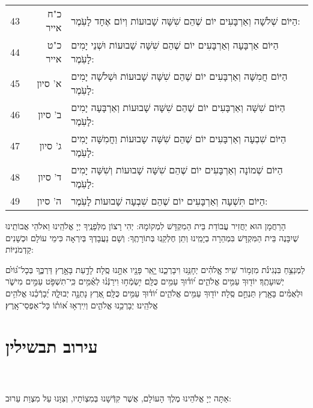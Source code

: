 \documentclass[twoside, openany, parskip=half, 11pt]{book}
\begin{document}
\begin{scriptsize}
\begin{longtable}{ l | r | p{} }
 43 &  כ"ח אייר & הַיּוֹם שְׁלֹשָׁה וְאַרְבָּעִים יוֹם שֶׁהֵם שִׁשָּׁה שָׁבוּעוֹת וְיוֹם אֶחָד לָעֹֽמֶר: \\
 44 &  כ"ט אייר & הַיּוֹם אַרְבָּעָה וְאַרְבָּעִים יוֹם שֶׁהֵם שִׁשָּׁה שָׁבוּעוֹת וּשְׁנֵי יָמִים לָעֹֽמֶר: \\
 45 &  א' סיון & הַיּוֹם חֲמִשָּׁה וְאַרְבָּעִים יוֹם שֶׁהֵם שִׁשָּׁה שָׁבוּעוֹת וּשְׁלֹשָׁה יָמִים לָעֹֽמֶר: \\
 46 &  ב' סיון &  הַיּוֹם שִׁשָּׁה וְאַרְבָּעִים יוֹם שֶׁהֵם שִׁשָּׁה שָׁבוּעוֹת וְאַרְבָּעָה יָמִים לָעֹֽמֶר: \\
  47 &  ג' סיון &  הַיּוֹם שִׁבְעָה וְאַרְבָּעִים יוֹם שֶׁהֵם שִׁשָּׁה שָבוּעוֹת וַחֲמִשָּׁה יָמִים לָעֹֽמֶר: \\
 48 &  ד' סיון &  הַיּוֹם שְׁמוֹנָה וְאַרְבָּעִים יוֹם שֶׁהֵם שִׁשָּׁה שָׁבוּעוֹת וְשִׁשָּׁה יָמִים לָעֹֽמֶר: \\
49 &  ה' סיון & הַיּוֹם תִּשְׁעָה וְאַרְבָּעִים יוֹם שֶׁהֵם שִׁבְעָה שָׁבוּעוֹת לָעֹֽמֶר:
\end{longtable}
\end{scriptsize}



הָרַחֲמָן הוּא יַחֲזִיר עֲבוֹדַת בֵּית הַמִקְדָּשׁ לִמְקוֹמָהּ: 
יְהִי רָצוֹן מִלְּפָנֶֽיךָ יְיָ אֱלֹהֵֽינוּ וֵאלֹהֵי אֲבוֹתֵֽינוּ שֶׁיִבָּנֶה בֵּית הַמִּקְדָּשׁ בִּמְהֵרָה בְיָמֵֽינוּ וְתֵן חֶלְקֵֽנוּ בְּתוֹרָתֶֽךָ: וְשָׁם נַעֲבָדְךָ בְּיִרְאָה כִּימֵי עוֹלָם וּכְשָׁנִים קַדְמֹנִיּוֹת: 


לַמְנַצֵּ֥חַ בִּנְגִינֹ֗ת מִזְמ֥וֹר שִֽׁיר׃ אֱֽלֹהִ֗ים יְחָנֵּ֥נוּ וִיבָרְכֵ֑נוּ יָ֤אֵֽר פָּנָ֖יו אִתָּ֣נוּ סֶֽלָה׃ לָדַ֣עַת בָּאָ֣רֶץ דַּרְכֶּ֑ךָ בְּכָל־גּ֝וֹיִ֗ם יְשׁוּעָתֶֽךָ׃ יוֹד֖וּךָ עַמִּ֥ים אֱלֹהִ֑ים י֝וֹד֗וּךָ עַמִּ֥ים כֻּלָּֽם׃ יִ֥שְׂמְֿח֥וּ וִירַנְּֿנ֗וּ לְאֻ֫מִּ֥ים כִּֽי־תִשְׁפֹּ֣ט עַמִּ֣ים מִישֹׁ֑ר וּלְאֻמִּ֓ים  בָּאָ֖רֶץ תַּנְחֵ֣ם סֶֽלָה׃ יוֹד֖וּךָ עַמִּ֥ים אֱלֹהִ֑ים י֝וֹד֗וּךָ עַמִּ֥ים כֻּלָּֽם׃ אֶ֭רֶץ נָתְנָ֣ה יְבוּלָ֑הּ יְ֝בָרְֿכֵ֗נוּ אֱלֹהִ֥ים
 אֱלֹהֵֽינוּ׃ יְבָרְכֵ֥נוּ אֱלֹהִ֑ים וְיִֽירְא֥וּ א֝וֹת֗וֹ כָּל־אַפְסֵי־אָֽרֶץ׃

\chapter[עירוב תבשילין]{ עירוב תבשילין }

\\
\\
 אַתָּה יְיָ אֱלֹהֵינוּ מֶלֶךְ הָעוֹלָם, אֲשֶׁר קִדְּֿשָׁנוּ בְּמִצְוֹתָיו, וְצִוָּנוּ עַל מִצְוַת עֵרוּב:
\end{document}
